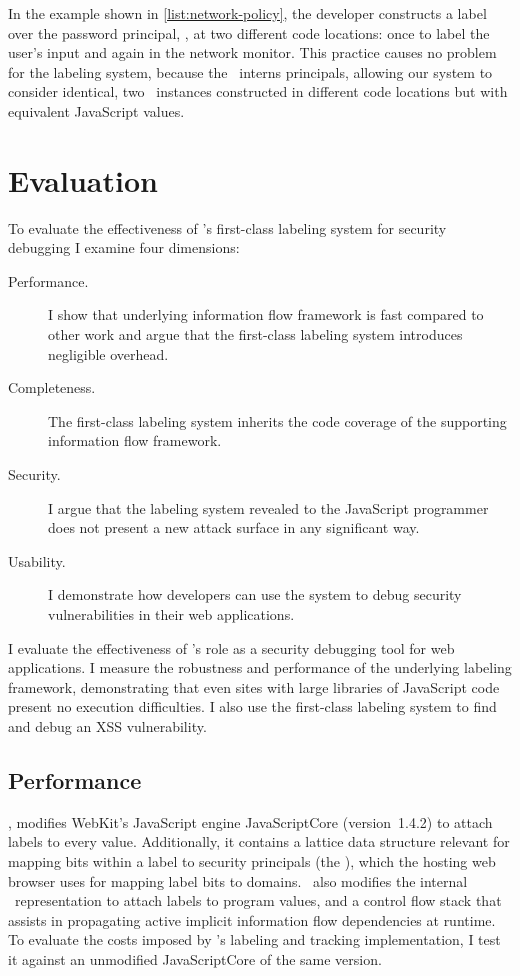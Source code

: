 In the example shown in \autoref{list:network-policy}, the developer constructs a label over the password principal, , at two different code locations: once to label the user's input and again in the network monitor.
This practice causes no problem for the labeling system, because the \FlowLabelRegistry\ interns principals, allowing our system to consider identical, two \FlowLabelObject\ instances constructed in different code locations but with equivalent JavaScript values.

\section{Evaluation}
\label{sec:first-class-evaluation}

To evaluate the effectiveness of \FlowCore's first-class labeling system for security debugging I examine four dimensions:
\begin{description}
\item[Performance.] I show that underlying information flow framework is fast compared to other work and argue that the first-class labeling system introduces negligible overhead.
\item[Completeness.] The first-class labeling system inherits the code coverage of the supporting information flow framework.
\item[Security.] I argue that the labeling system revealed to the JavaScript programmer does not present a new attack surface in any significant way.
\item[Usability.] I demonstrate how developers can use the system to debug security vulnerabilities in their web applications.
\end{description}

I evaluate the effectiveness of \FlowCore's role as a security debugging tool for web applications.
I measure the robustness and performance of the underlying labeling framework, demonstrating that even sites with large libraries of JavaScript code present no execution difficulties.
I also use the first-class labeling system to find and debug an XSS vulnerability.

\subsection{Performance}
\label{sec:first-class-performance}

\FlowCore, modifies WebKit's JavaScript engine JavaScriptCore (version~1.4.2) to attach labels to every value.
Additionally, it contains a lattice data structure relevant for mapping bits within a label to security principals (the \FlowLabelRegistry), which the hosting web browser uses for mapping label bits to domains.
\FlowCore\ also modifies the internal \JSValue\ representation to attach labels to program values, and a control flow stack that assists in propagating active implicit information flow dependencies at runtime.
To evaluate the costs imposed by \FlowCore's labeling and tracking implementation, I test it against an unmodified JavaScriptCore of the same version.

